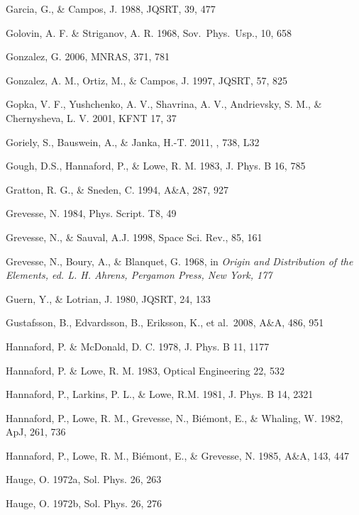 \documentclass[traditabstract]{aa}
\begin{document}
\begin{thebibliography}{}
  Garcia, G., \& Campos, J. 1988, JQSRT, 39, 477

  Golovin, A. F. \& Striganov, A. R. 1968, Sov.\ Phys.\ Usp., 10, 658

  Gonzalez, G. 2006, MNRAS, 371, 781

  Gonzalez, A. M., Ortiz, M., \& Campos, J. 1997, JQSRT, 57, 825

  Gopka, V. F., Yushchenko, A. V., Shavrina, A. V., Andrievsky, S. M., \& Chernysheva, L. V. 2001, KFNT 17, 37

  {Goriely}, S., {Bauswein}, A., \& {Janka}, H.-T. 2011, \apjl, 738, L32

  Gough, D.S., Hannaford, P., \& Lowe, R. M. 1983, J. Phys. B 16, 785

  Gratton, R. G., \& Sneden, C. 1994, A\&A, 287, 927

  Grevesse, N. 1984, Phys. Script. T8, 49

  Grevesse, N., \& Sauval, A.J. 1998, Space Sci. Rev., 85, 161
 
  Grevesse, N., Boury, A., \& Blanquet, G. 1968, in \it Origin and Distribution of the Elements\rm, ed. L. H. Ahrens, Pergamon Press, New York, 177

  Guern, Y., \& Lotrian, J. 1980, JQSRT, 24, 133

  Gustafsson, B., Edvardsson, B., Eriksson, K., et al.\ 2008, A\&A, 486, 951

  Hannaford, P. \& McDonald, D. C. 1978, J. Phys. B 11, 1177

  Hannaford, P. \& Lowe, R. M. 1983, Optical Engineering 22, 532

  Hannaford, P., Larkins, P. L., \& Lowe, R.M. 1981, J. Phys. B 14, 2321

  Hannaford, P., Lowe, R. M., Grevesse, N., Bi\'emont, E., \& Whaling, W.  1982, ApJ, 261, 736

  Hannaford, P., Lowe, R. M., Bi\'emont, E., \& Grevesse, N. 1985, A\&A, 143, 447

  Hauge, O. 1972a, Sol. Phys. 26, 263

  Hauge, O. 1972b, Sol. Phys. 26, 276


\end{thebibliography}
\end{document}
